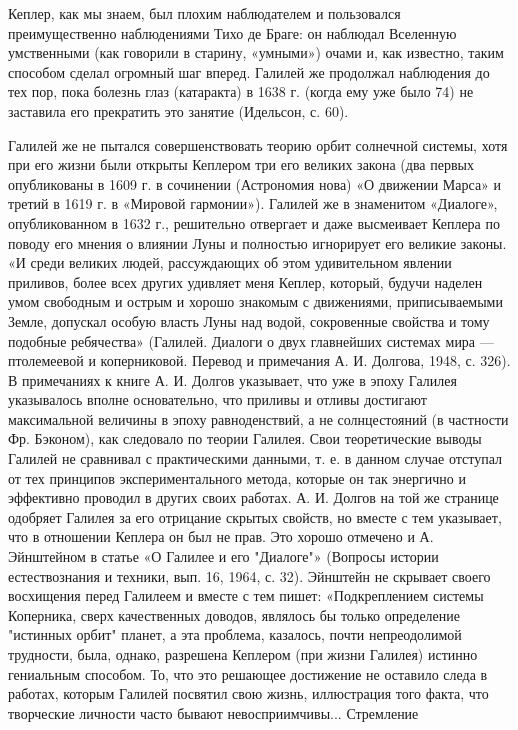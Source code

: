 Кеплер, как мы знаем, был плохим наблюдателем и пользовался преимущественно
наблюдениями Тихо де Браге: он наблюдал Вселенную умственными (как говорили в
старину, «умными») очами и, как известно, таким способом сделал огромный шаг
вперед. Галилей же продолжал наблюдения до тех пор, пока болезнь глаз
(катаракта) в 1638 г. (когда ему уже было 74) не заставила его прекратить это
занятие (Идельсон, с. 60).

Галилей же не пытался совершенствовать теорию орбит солнечной системы, хотя при
его жизни были открыты Кеплером три его великих закона (два первых опубликованы
в 1609 г. в сочинении (Астрономия нова) «О движении Марса» и третий в 1619 г. в
«Мировой гармонии»). Галилей же в знаменитом «Диалоге», опубликованном в 1632
г., решительно отвергает и даже высмеивает Кеплера по поводу его мнения о
влиянии Луны и полностью игнорирует его великие законы. «И среди великих людей,
рассуждающих об этом удивительном явлении приливов, более всех других удивляет
меня Кеплер, который, будучи наделен умом свободным и острым и хорошо знакомым
с движениями, приписываемыми Земле, допускал особую власть Луны над водой,
сокровенные свойства и тому подобные ребячества» (Галилей. Диалоги о двух
главнейших системах мира --- птолемеевой и коперниковой. Перевод и примечания А.
И. Долгова, 1948, с. 326). В примечаниях к книге А. И. Долгов указывает, что
уже в эпоху Галилея указывалось вполне основательно, что приливы и отливы
достигают максимальной величины в эпоху равноденствий, а не солнцестояний (в
частности Фр. Бэконом), как следовало по теории Галилея. Свои теоретические
выводы Галилей не сравнивал с практическими данными, т. е. в данном случае
отступал от тех принципов экспериментального метода, которые он так энергично и
эффективно проводил в других своих работах. А. И. Долгов на той же странице
одобряет Галилея за его отрицание скрытых свойств, но вместе с тем указывает,
что в отношении Кеплера он был не прав. Это хорошо отмечено и А. Эйнштейном в
статье «О Галилее и его "Диалоге"» (Вопросы истории естествознания и техники,
вып. 16, 1964, с. 32). Эйнштейн не скрывает своего восхищения перед Галилеем и
вместе с тем пишет: «Подкреплением системы Коперника, сверх качественных
доводов, являлось бы только определение "истинных орбит" планет, а эта
проблема, казалось, почти непреодолимой трудности, была, однако, разрешена
Кеплером (при жизни Галилея) истинно гениальным способом. То, что это решающее
достижение
не оставило следа в работах, которым Галилей посвятил свою жизнь, иллюстрация
того факта, что творческие личности часто бывают невосприимчивы... Стремление
